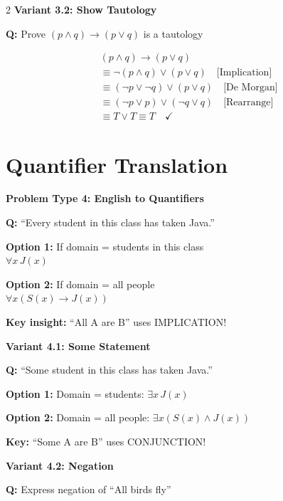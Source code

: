 \documentclass[8pt,a4paper]{article}
\newenvironment{exbox}[1][]{\vspace{2pt}\noindent\textbf{#1}\par\smallskip}{\vspace{2pt}}
\newenvironment{solbox}{\vspace{2pt}\begin{leftbar}}{\end{leftbar}\vspace{2pt}}
\begin{document}
\begin{multicols}{2}
\begin{exbox}[Variant 3.2: Show Tautology]
\textbf{Q:} Prove $(p \land q) \to (p \lor q)$ is a tautology

\begin{solbox}
\begin{align*}
&(p \land q) \to (p \lor q) \\
&\equiv \neg(p \land q) \lor (p \lor q) \quad \text{[Implication]} \\
&\equiv (\neg p \lor \neg q) \lor (p \lor q) \quad \text{[De Morgan]} \\
&\equiv (\neg p \lor p) \lor (\neg q \lor q) \quad \text{[Rearrange]} \\
&\equiv T \lor T \equiv T \quad \checkmark
\end{align*}
\end{solbox}
\end{exbox}

\section{Quantifier Translation}

\begin{exbox}[Problem Type 4: English to Quantifiers]
\textbf{Q:} ``Every student in this class has taken Java.''

\textbf{Option 1:} If domain = students in this class\\
$\forall x\, J(x)$

\textbf{Option 2:} If domain = all people\\
$\forall x(S(x) \to J(x))$

\textbf{Key insight:} ``All A are B'' uses IMPLICATION!
\end{exbox}

\begin{exbox}[Variant 4.1: Some Statement]
\textbf{Q:} ``Some student in this class has taken Java.''

\textbf{Option 1:} Domain = students: $\exists x\, J(x)$

\textbf{Option 2:} Domain = all people: $\exists x(S(x) \land J(x))$

\textbf{Key:} ``Some A are B'' uses CONJUNCTION!
\end{exbox}

\begin{exbox}[Variant 4.2: Negation]
\textbf{Q:} Express negation of ``All birds fly''


\end{exbox}
\end{multicols}
\end{document}
